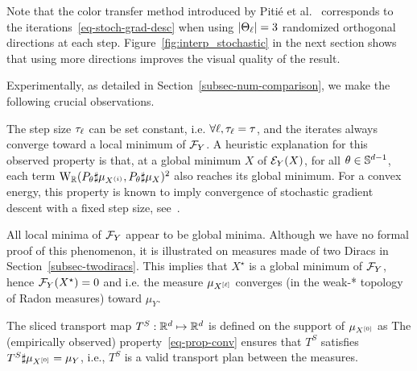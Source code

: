 Note that the color transfer method introduced by Piti\'{e} et al.~\cite{pitie2005n} corresponds to the iterations~\eqref{eq-stoch-grad-desc} when using $|\Theta_\ell|=3$ randomized orthogonal directions at each step. 
Figure~\ref{fig:interp_stochastic} in the next section shows that using more directions improves the visual quality of the result. 

Experimentally, as detailed in Section~\ref{subsec-num-comparison}, we make the following crucial observations.
\begin{rem}
The step size $\tau_\ell$ can be set constant, i.e. $\forall \ell, \tau_\ell=\tau$, and the iterates always converge toward a local minimum of $\mathcal{F}_Y$. A heuristic explanation for this observed property is that, at a global minimum $X$ of $\mathcal{E}_Y(X)$, for all $\theta \in \mathbb{S}^{d-1}$, each term $\text{\upshape W}_{\mathbb{R}}( P_\theta \sharp \mu_{X^{(i)}}, P_\theta \sharp \mu_X )^2$ also reaches its global minimum. For a convex energy, this property is known to imply convergence of stochastic gradient descent with a fixed step size, see~\cite{Solodov-incremental}. 
\end{rem}

\begin{rem}
All local minima of $\mathcal{F}_{Y}$ appear to be global minima. Although we have no formal proof of this phenomenon, it is illustrated on measures made of two Diracs in Section~\ref{subsec-twodiracs}. This implies that $X^\star$ is a global minimum of $\mathcal{F}_Y$, hence $\mathcal{F}_Y(X^\star)=0$ and 
i.e. the measure $\mu_{X^{[\ell]}}$ converges (in the weak-* topology of Radon measures) toward $\mu_Y$.
\end{rem}


The sliced transport map $T^S : \mathbb{R}^d \mapsto \mathbb{R}^d$ is defined on the support of $\mu_{{X}^{[0]}}$ as 
The (empirically observed) property~\eqref{eq-prop-conv} ensures that $T^S$ satisfies $T^S \sharp \mu_{{X}^{[0]}} = \mu_Y$, i.e., $T^S$ is a valid transport plan between the measures. 
